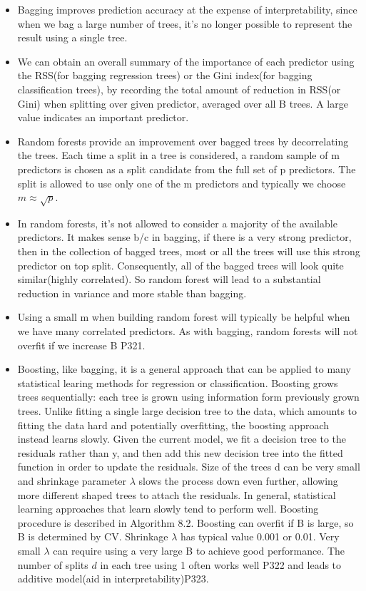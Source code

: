 \documentclass[a4paper, 12pt]{article}
\begin{document}
\begin{itemize}
	\item Bagging improves prediction accuracy at the expense of interpretability, since when we bag a large number of trees, it's no longer possible to represent the result using a single tree.
	\item We can obtain an overall summary of the importance of each predictor using the RSS(for bagging regression trees) or the Gini index(for bagging classification trees), by recording the total amount of reduction in RSS(or Gini) when splitting over given predictor, averaged over all B trees. A large value indicates an important predictor.
	\item Random forests provide an improvement over bagged trees by decorrelating the trees. Each time a split in a tree is considered, a random sample of m predictors is chosen as a split candidate from the full set of p predictors. The split is allowed to use only one of the m predictors and typically we choose $m \approx \sqrt{p}$.
	\item In random forests, it's not allowed to consider a majority of the available predictors. It makes sense b/c in bagging, if there is a very strong predictor, then in the collection of bagged trees, most or all the trees will use this strong predictor on top split. Consequently, all of the bagged trees will look quite similar(highly correlated). So random forest will lead to a substantial reduction in variance and more stable than bagging.
	\item Using a small m when building random forest will typically be helpful when we have many correlated predictors. As with bagging, random forests will not overfit if we increase B P321.
	\item Boosting, like bagging, it is a general approach that can be applied to many statistical learing methods for regression or classification. Boosting grows trees sequentially: each tree is  grown using information form previously grown trees. Unlike fitting a single large decision tree to the data, which amounts to fitting the data hard and potentially overfitting, the boosting approach instead learns slowly. Given the current model, we fit a decision tree to the residuals rather than y, and then add this new decision tree into the fitted function in order to update the residuals. Size of the trees d can be very small and shrinkage parameter $\lambda$ slows the process down even further, allowing more different shaped trees to attach the residuals. In general, statistical learning approaches that learn slowly tend to perform well. Boosting procedure is described in Algorithm 8.2. Boosting can overfit if B is large, so B is determined by CV. Shrinkage $\lambda$ has typical value 0.001 or 0.01. Very small $\lambda$ can require using a very large B to achieve good performance. The number of splits $d$ in each tree using 1 often works well P322 and leads to additive model(aid in interpretability)P323.

\end{itemize}
\end{document}
